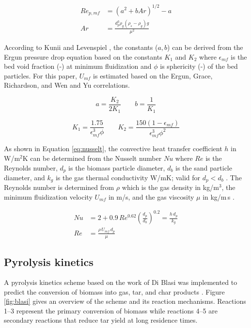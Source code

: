 \begin{align}
    Re_{p,mf} &= \left( a^2 + b Ar \right)^{1/2} - a \\
    Ar &= \frac{d_p^3 \rho_g (\rho_s - \rho_g) g}{\mu^2}
\end{align}

According to Kunii and Levenspiel \cite{Levenspiel-1991}, the constants ($a, b$) can be derived from the Ergun pressure drop equation based on the constants $K_1$ and $K_2$ where $\epsilon_{mf}$ is the bed void fraction (-) at minimum fluidization and $\phi$ is sphericity (-) of the bed particles. For this paper, $U_{mf}$ is estimated based on the Ergun, Grace, Richardson, and Wen and Yu correlations.

\begin{equation}
    a = \frac{K_2}{2 K_1} \qquad
    b = \frac{1}{K_1}
\end{equation}

\begin{equation}
    K_1 = \frac{1.75}{\epsilon_{mf}^3 \phi} \qquad
    K_2 = \frac{150(1-\epsilon_{mf})}{\epsilon_{mf}^3 \phi^2}
\end{equation}

As shown in Equation \ref{eq:nusselt}, the convective heat transfer coefficient $h$ in W/m$^2$K can be determined from the Nusselt number $Nu$ where $Re$ is the Reynolds number, $d_p$ is the biomass particle diameter, $d_b$ is the sand particle diameter, and $k_g$ is the gas thermal conductivity W/mK; valid for $d_p < d_b$ \cite{Collier-2004}. The Reynolds number is determined from $\rho$ which is the gas density in kg/m$^3$, the minimum fluidization velocity $U_{mf}$ in m/s, and the gas viscosity $\mu$ in kg/m\,s \cite{Papadikis-2010}.

\begin{align}
    Nu &= 2 + 0.9\, Re^{0.62} \left(\frac{d_p}{d_b}\right)^{0.2} = \frac{h\, d_p}{k_g} \label{eq:nusselt} \\
    Re &= \frac{\rho\, U_{mf}\, d_p}{\mu} \label{eq:reynolds}
\end{align}


\subsection{Pyrolysis kinetics}

A pyrolysis kinetics scheme based on the work of Di Blasi was implemented to predict the conversion of biomass into gas, tar, and char products \cite{Blasi-1993,Blasi-2001}. Figure \ref{fig:blasi} gives an overview of the scheme and its reaction mechanisms. Reactions 1--3 represent the primary conversion of biomass while reactions 4--5 are secondary reactions that reduce tar yield at long residence times.


